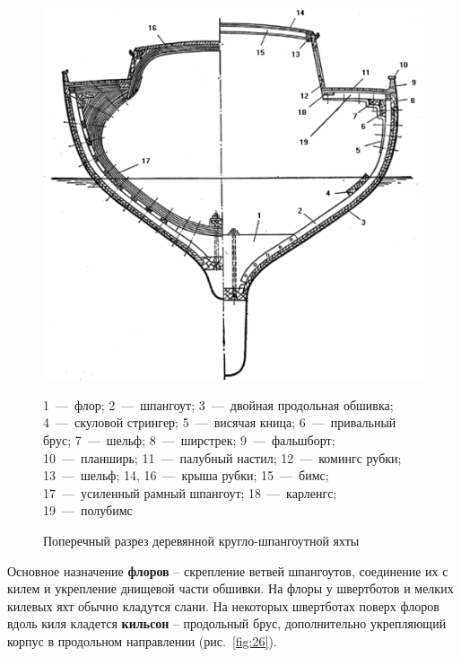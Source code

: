 \documentclass[a4paper, 12pt, twoside, final]{scrbook}
\begin{document}
\begin{figure}[htbp]
\begin{centering}
\includegraphics{pics/Razrez_1}
\par\end{centering}

\protect\caption{\label{fig:27}Поперечный разрез деревянной кругло-шпангоутной яхты}


\begin{centering}\small
1~---~флор; 2~---~шпангоут; 3~---~двойная продольная обшивка; 4~---~скуловой
стрингер; 5~---~висячая кница; 6~---~привальный брус; 7~---~шельф; 8~---~ширстрек;
9~---~фальшборт; 10~---~планширь; 11~---~палубный настил; 12~---~комингс рубки;
13~---~шельф; 14, 16~---~крыша рубки; 15~---~бимс; 17~---~усиленный рамный
шпангоут; 18~---~карленгс; 19~---~полубимс
\par\end{centering}

\end{figure}


Основное назначение \textbf{флоров} \--- скрепление ветвей шпангоутов,
соединение их с килем и укрепление днищевой части обшивки. На флоры
у швертботов и мелких килевых яхт обычно кладутся слани. На некоторых
швертботах поверх флоров вдоль киля кладется \textbf{кильсон} \--- продольный
брус, дополнительно укрепляющий корпус в продольном направлении (рис.~\ref{fig:26}).
\end{document}
